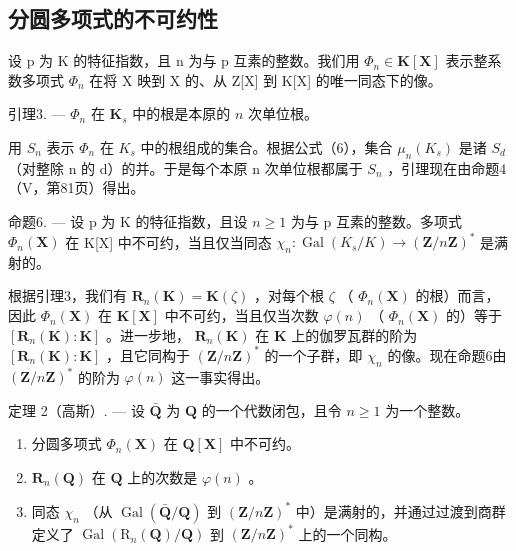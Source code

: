 \subsection{分圆多项式的不可约性}

设 p 为 K 的特征指数，且 n 为与 p 互素的整数。我们用 \(\Phi_{n} \in \mathbf{K}[\mathbf{X}]\) 表示整系数多项式 \(\Phi_{n}\) 在将 X 映到 X 的、从 Z{[}X{]} 到 K{[}X{]} 的唯一同态下的像。

引理3. --- \(\Phi_n\) 在 \(\mathbf{K}_s\) 中的根是本原的 \(n\) 次单位根。

用 \(S_{n}\) 表示 \(\Phi_{n}\) 在 \(K_{s}\) 中的根组成的集合。根据公式（6），集合 \(\mu_{n}(K_{s})\) 是诸 \(S_{d}\) （对整除 n 的 d）的并。于是每个本原 n 次单位根都属于 \(S_{n}\) ，引理现在由命题4（V，第81页）得出。

命题6. --- 设 p 为 K 的特征指数，且设 \(n \geqslant 1\) 为与 p 互素的整数。多项式 \(\Phi_{n}(\mathbf{X})\) 在 K{[}X{]} 中不可约，当且仅当同态 \(\chi_{n}: \operatorname{Gal}(K_{s}/K) \to (\mathbf{Z}/n\mathbf{Z})^{*}\) 是满射的。

根据引理3，我们有 \(\mathbf{R}_n(\mathbf{K}) = \mathbf{K}(\zeta)\) ，对每个根 \(\zeta\) （ \(\Phi_n(\mathbf{X})\) 的根）而言，因此 \(\Phi_n(\mathbf{X})\) 在 \(\mathbf{K}[\mathbf{X}]\) 中不可约，当且仅当次数 \(\varphi(n)\) （ \(\Phi_n(\mathbf{X})\) 的）等于 \([\mathbf{R}_n(\mathbf{K}) : \mathbf{K}]\) 。进一步地， \(\mathbf{R}_n(\mathbf{K})\) 在 \(\mathbf{K}\) 上的伽罗瓦群的阶为 \([\mathbf{R}_n(\mathbf{K}) : \mathbf{K}]\) ，且它同构于 \((\mathbf{Z}/n\mathbf{Z})^*\) 的一个子群，即 \(\chi_n\) 的像。现在命题6由 \((\mathbf{Z}/n\mathbf{Z})^*\) 的阶为 \(\varphi(n)\) 这一事实得出。

定理 2（高斯）. --- 设 \(\bar{\mathbf{Q}}\) 为 \(\mathbf{Q}\) 的一个代数闭包，且令 \(n \geqslant 1\) 为一个整数。

\begin{enumerate}
\def\labelenumi{\alph{enumi})}
\item
  分圆多项式 \(\Phi_n(\mathbf{X})\) 在 \(\mathbf{Q}[\mathbf{X}]\) 中不可约。
\item
  \(\mathbf{R}_n(\mathbf{Q})\) 在 \(\mathbf{Q}\) 上的次数是 \(\varphi(n)\) 。
\item
  同态 \(\chi_{n}\) （从 \(\operatorname{Gal}(\bar{\mathbf{Q}} / \mathbf{Q})\) 到 \((\mathbf{Z} / n\mathbf{Z})^{*}\) 中）是满射的，并通过过渡到商群定义了 \(\operatorname{Gal}(\mathrm{R}_n(\mathbf{Q}) / \mathbf{Q})\) 到 \((\mathbf{Z} / n\mathbf{Z})^{*}\) 上的一个同构。
\end{enumerate}


